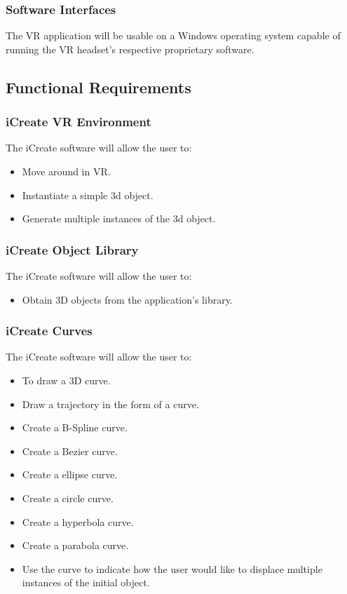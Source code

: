 \documentclass[letterpaper,draftclsnofoot,onecolumn,10 pt,compsoc]{IEEEtran}
\begin{document}
\subsubsection{Software Interfaces}
The VR application will be usable on a Windows operating system capable of running the VR headset’s respective proprietary software.

\subsection{Functional Requirements}
\subsubsection{iCreate VR Environment}
The iCreate software will allow the user to:
\begin{itemize}
\item Move around in VR.
\item Instantiate a simple 3d object.
\item Generate multiple instances of the 3d object.
\end{itemize}

\subsubsection{iCreate Object Library}
The iCreate software will allow the user to:
\begin{itemize}
\item Obtain 3D objects from the application's library.
\end{itemize}

\subsubsection{iCreate Curves}
The iCreate software will allow the user to:
\begin{itemize}
\item To draw a 3D curve.
\item Draw a trajectory in the form of a curve.
\item Create a B-Spline curve.
\item Create a Bezier curve.
\item Create a ellipse curve.
\item Create a circle curve.
\item Create a hyperbola curve.
\item Create a parabola curve.
\item Use the curve to indicate how the user would like to displace multiple instances of the initial object.
\end{itemize}
\end{document}
